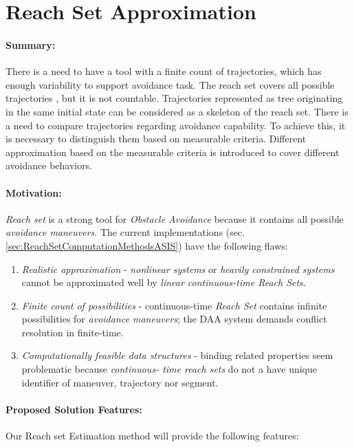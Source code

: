 \cleardoublepage
\section{Reach Set Approximation}\label{s:reachSet}
\paragraph{Summary:} There is a need to have a tool with a finite count of trajectories, which has enough variability to support avoidance task. The reach set covers all possible trajectories , but it is not countable. Trajectories represented as tree originating in the same initial state can be considered as a skeleton of the reach set. There is a need to compare trajectories regarding avoidance capability. To achieve this, it is necessary to distinguish them based on measurable criteria. Different approximation based on the measurable criteria is introduced to cover different avoidance behaviors. 

    \noindent\paragraph{Motivation:} \emph{Reach set} is a strong tool for \emph{Obstacle Avoidance} because it contains all possible \emph{avoidance maneuvers}. The current implementations (sec. \ref{sec:ReachSetComputationMethodsASIS}) have the following flaws:
    
    \begin{enumerate}
        \item \emph{Realistic approximation} - \emph{nonlinear systems} or \emph{heavily constrained systems} cannot be approximated well by \emph{linear continuous-time Reach Sets}.
        
        \item \emph{Finite count of possibilities} - continuous-time \emph{Reach Set} contains  infinite possibilities for \emph{avoidance maneuvers}; the DAA system demands conflict resolution in finite-time.
        
        \item \emph{Computationally feasible data structures} - binding related properties seem problematic because \emph{continuous- time reach sets} do not a have unique identifier of maneuver, trajectory nor segment. 
    \end{enumerate}
    
    \paragraph{Proposed Solution Features:} Our Reach set Estimation method will provide the following features:
    
